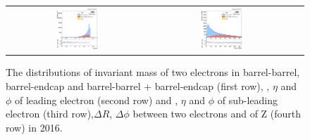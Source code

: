 \begin{figure}[ht]
\begin{center}
\begin{tabular}{ccc}
      \includegraphics[width=0.32\textwidth]{figures/Zprime/2016/complementary/h_Dphi_ll.png}&
      \includegraphics[width=0.32\textwidth]{figures/Zprime/2016/complementary/h_Ptll.png}\\
    \end{tabular}
    \caption{The distributions of invariant mass of two electrons in barrel-barrel, barrel-endcap and barrel-barrel + barrel-endcap (first row), \et, $\eta$ and $\phi$ of leading electron (second row) and \et, $\eta$ and $\phi$ of sub-leading electron (third row),$\Delta R$, $\Delta\phi$ between two electrons and \pt of Z (fourth row) in 2016.
    \label{fig:complementary_2016}}
  \end{center}
\end{figure}

